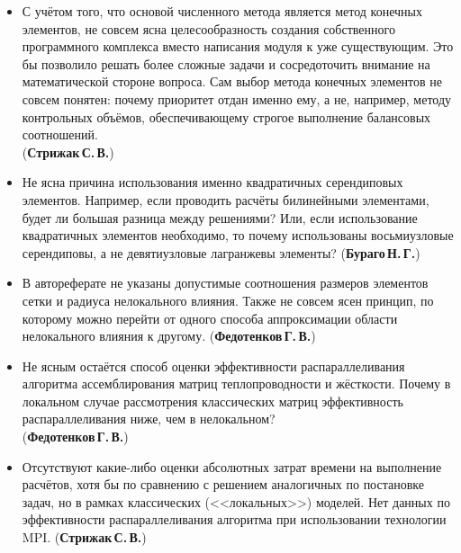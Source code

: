 \begin{frame}
	\begin{itemize}
		\justifying
		\item С учётом того, что основой численного метода является метод конечных элементов, не совсем ясна целесообразность создания собственного программного комплекса вместо написания модуля к уже существующим. Это бы позволило решать более сложные задачи и сосредоточить внимание на математической стороне вопроса. Сам выбор метода конечных элементов не совсем понятен: почему приоритет отдан именно ему, а не, например, методу контрольных объёмов, обеспечивающему строгое выполнение балансовых соотношений. \\ (\textbf{Стрижак\,С.\,В.})
	\end{itemize}
\end{frame}

\begin{frame}
	\begin{itemize}
		\justifying
		\item Не ясна причина использования именно квадратичных серендиповых элементов. Например, если проводить расчёты билинейными элементами, будет ли большая разница между решениями? Или, если использование квадратичных элементов необходимо, то почему использованы восьмиузловые серендиповы, а не девятиузловые лагранжевы элементы? (\textbf{Бураго\,Н.\,Г.})
		\item В автореферате не указаны допустимые соотношения размеров элементов сетки и радиуса нелокального влияния. Также не совсем ясен принцип, по которому можно перейти от одного способа аппроксимации области нелокального влияния к другому. (\textbf{Федотенков\,Г.\,В.})
	\end{itemize}
\end{frame}

\begin{frame}
	\begin{itemize}
		\justifying
		\item Не ясным остаётся способ оценки эффективности распараллеливания алгоритма ассемблирования матриц теплопроводности и жёсткости. Почему в локальном случае рассмотрения классических матриц эффективность распараллеливания ниже, чем в нелокальном? \\ (\textbf{Федотенков\,Г.\,В.})
		\item Отсутствуют какие-либо оценки абсолютных затрат времени на выполнение расчётов, хотя бы по сравнению с решением аналогичных по постановке задач, но в рамках классических (<<локальных>>) моделей. Нет данных по эффективности распараллеливания алгоритма при использовании технологии MPI. (\textbf{Стрижак\,С.\,В.})
	\end{itemize}
\end{frame}

